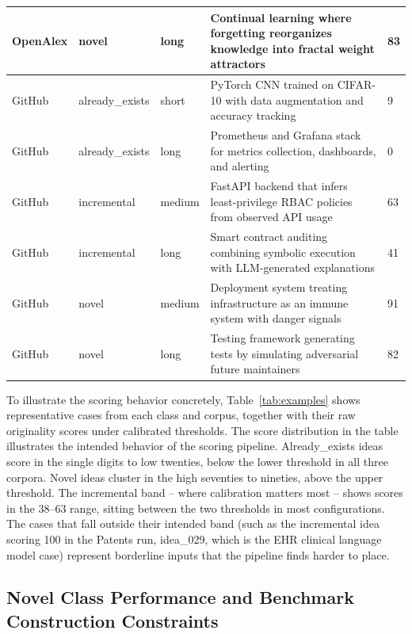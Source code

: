 \begin{table}[width=\textwidth,cols=5,pos=ht]
\begin{tabular*}{\textwidth}{@{\extracolsep{\fill}}lllp{6cm}l@{}}
        OpenAlex & novel           & long   & Continual learning where forgetting reorganizes knowledge into fractal weight attractors & 83  \\
        \midrule
        GitHub   & already\_exists & short  & PyTorch CNN trained on CIFAR-10 with data augmentation and accuracy tracking        & 9     \\
        GitHub   & already\_exists & long   & Prometheus and Grafana stack for metrics collection, dashboards, and alerting       & 0     \\
        GitHub   & incremental     & medium & FastAPI backend that infers least-privilege RBAC policies from observed API usage   & 63    \\
        GitHub   & incremental     & long   & Smart contract auditing combining symbolic execution with LLM-generated explanations & 41   \\
        GitHub   & novel           & medium & Deployment system treating infrastructure as an immune system with danger signals    & 91    \\
        GitHub   & novel           & long   & Testing framework generating tests by simulating adversarial future maintainers      & 82    \\
        \bottomrule
    \end{tabular*}
\end{table}
 
To illustrate the scoring behavior concretely, Table~\ref{tab:examples} shows representative cases from each class and corpus, together with their raw originality scores under calibrated thresholds. The score distribution in the table illustrates the intended behavior of the scoring pipeline. Already\_exists ideas score in the single digits to low twenties, below the lower threshold in all three corpora. Novel ideas cluster in the high seventies to nineties, above the upper threshold. The incremental band -- where calibration matters most -- shows scores in the 38--63 range, sitting between the two thresholds in most configurations. The cases that fall outside their intended band (such as the incremental idea scoring 100 in the Patents run, idea\_029, which is the EHR clinical language model case) represent borderline inputs that the pipeline finds harder to place.
 
\subsection{Novel Class Performance and Benchmark Construction Constraints}
 
